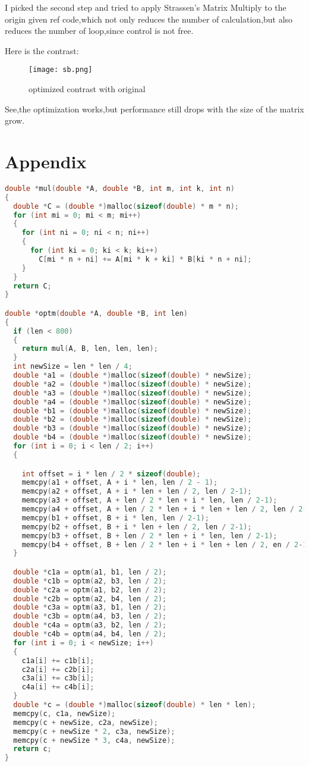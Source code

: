 \documentclass[11pt]{scrartcl} %
\begin{document}
I picked the second step and tried to apply Strassen's Matrix Multiply to the origin given ref code,which not only reduces the number of calculation,but also reduces the number of loop,since control is not free.

Here is the contrast:
\begin{figure}[H]
	\centering
	\texttt{[image: sb.png]}
	\caption{optimized contrast with original}
	\label{}
\end{figure}
See,the optimization works,but performance still drops with the size of the matrix grow.
\newpage
\section{Appendix}
	\begin{lstlisting}[language=c++]
double *mul(double *A, double *B, int m, int k, int n)
{
  double *C = (double *)malloc(sizeof(double) * m * n);
  for (int mi = 0; mi < m; mi++)
  {
    for (int ni = 0; ni < n; ni++)
    {
      for (int ki = 0; ki < k; ki++)
        C[mi * n + ni] += A[mi * k + ki] * B[ki * n + ni];
    }
  }
  return C;
}

double *optm(double *A, double *B, int len)
{
  if (len < 800)
  {
    return mul(A, B, len, len, len);
  }
  int newSize = len * len / 4;
  double *a1 = (double *)malloc(sizeof(double) * newSize);
  double *a2 = (double *)malloc(sizeof(double) * newSize);
  double *a3 = (double *)malloc(sizeof(double) * newSize);
  double *a4 = (double *)malloc(sizeof(double) * newSize);
  double *b1 = (double *)malloc(sizeof(double) * newSize);
  double *b2 = (double *)malloc(sizeof(double) * newSize);
  double *b3 = (double *)malloc(sizeof(double) * newSize);
  double *b4 = (double *)malloc(sizeof(double) * newSize);
  for (int i = 0; i < len / 2; i++)
  {

    int offset = i * len / 2 * sizeof(double);
    memcpy(a1 + offset, A + i * len, len / 2 - 1);
    memcpy(a2 + offset, A + i * len + len / 2, len / 2-1);
    memcpy(a3 + offset, A + len / 2 * len + i * len, len / 2-1);
    memcpy(a4 + offset, A + len / 2 * len + i * len + len / 2, len / 2-1);
    memcpy(b1 + offset, B + i * len, len / 2-1);
    memcpy(b2 + offset, B + i * len + len / 2, len / 2-1);
    memcpy(b3 + offset, B + len / 2 * len + i * len, len / 2-1);
    memcpy(b4 + offset, B + len / 2 * len + i * len + len / 2, en / 2-1);
  }

  double *c1a = optm(a1, b1, len / 2);
  double *c1b = optm(a2, b3, len / 2);
  double *c2a = optm(a1, b2, len / 2);
  double *c2b = optm(a2, b4, len / 2);
  double *c3a = optm(a3, b1, len / 2);
  double *c3b = optm(a4, b3, len / 2);
  double *c4a = optm(a3, b2, len / 2);
  double *c4b = optm(a4, b4, len / 2);
  for (int i = 0; i < newSize; i++)
  {
    c1a[i] += c1b[i];
    c2a[i] += c2b[i];
    c3a[i] += c3b[i];
    c4a[i] += c4b[i];
  }
  double *c = (double *)malloc(sizeof(double) * len * len);
  memcpy(c, c1a, newSize);
  memcpy(c + newSize, c2a, newSize);
  memcpy(c + newSize * 2, c3a, newSize);
  memcpy(c + newSize * 3, c4a, newSize);
  return c;
}
	\end{lstlisting}
\end{document}
